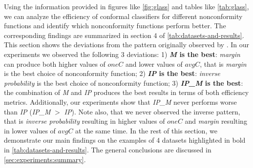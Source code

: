 Using the information provided in figures like \cref{fig:glass} and tables like \cref{tab:glass},
we can analyze the efficiency of conformal classifiers for different nonconformity functions
and identify which nonconformity functions perform better.
The corresponding findings are summarized in section 4 of \cref{tab:datasets-and-results}.
This section shows the deviations from the pattern originally observed by \cite{johansson2017model}.
In our experiments we observed the following 3 deviations:
1) \textbf{\textit{M} is the best}: \textit{margin} can produce both higher values of $oneC$ and lower values of $avgC$, that is \textit{margin} is the best choice of nonconformity function;
2) \textbf{\textit{IP} is the best}: \textit{inverse probability} is the best choice of
nonconformity function;
3) \textbf{\textit{IP\_M} is the best}: the combination of \textit{M} and \textit{IP} produces 
the best results in terms of both efficiency metrics.
Additionally, our experiments show that \textit{IP\_M} never performs worse than \textit{IP} 
(\textit{IP\_M} $>$ \textit{IP}).
Note also, that we never observed the inverse pattern, that is \textit{inverse probability} resulting 
in higher values of $oneC$ and \textit{margin} resulting in lower values of $avgC$ at the same time. 
In the rest of this section, we demonstrate our main findings on the examples of 4 datasets
highlighted in bold in \cref{tab:datasets-and-results}. The general conclusions are discussed
in \cref{sec:experiments:summary}.




